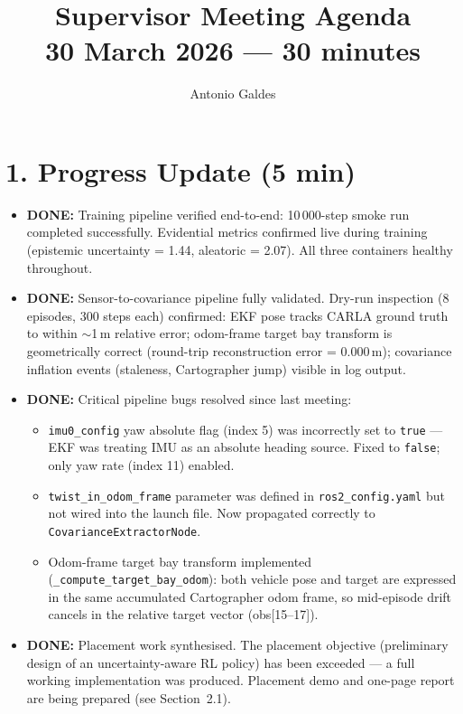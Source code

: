 \documentclass[11pt,a4paper]{article}
\title{Supervisor Meeting Agenda\\
\large 30 March 2026 --- 30 minutes}
\author{Antonio Galdes}
\date{}
\newcommand{\done}[1]{\textcolor{done}{\textbf{DONE:}} #1}
\begin{document}
\maketitle

\section*{1. Progress Update (5 min)}

\begin{itemize}[leftmargin=*]
  \item \done{Training pipeline verified end-to-end: 10\,000-step smoke run completed
    successfully. Evidential metrics confirmed live during training
    (epistemic uncertainty = 1.44, aleatoric = 2.07). All three containers
    healthy throughout.}

  \item \done{Sensor-to-covariance pipeline fully validated. Dry-run inspection
    (8 episodes, 300 steps each) confirmed: EKF pose tracks CARLA ground truth
    to within $\sim$1\,m relative error; odom-frame target bay transform is
    geometrically correct (round-trip reconstruction error = 0.000\,m);
    covariance inflation events (staleness, Cartographer jump) visible in log
    output.}

  \item \done{Critical pipeline bugs resolved since last meeting:
    \begin{itemize}
      \item \texttt{imu0\_config} yaw absolute flag (index 5) was incorrectly
        set to \texttt{true} --- EKF was treating IMU as an absolute heading
        source. Fixed to \texttt{false}; only yaw rate (index 11) enabled.
      \item \texttt{twist\_in\_odom\_frame} parameter was defined in
        \texttt{ros2\_config.yaml} but not wired into the launch file.
        Now propagated correctly to \texttt{CovarianceExtractorNode}.
      \item Odom-frame target bay transform implemented
        (\texttt{\_compute\_target\_bay\_odom}): both vehicle pose and target
        are expressed in the same accumulated Cartographer odom frame, so
        mid-episode drift cancels in the relative target vector
        (obs[15--17]).
    \end{itemize}}

  \item \done{Placement work synthesised. The placement objective (preliminary
    design of an uncertainty-aware RL policy) has been exceeded --- a full
    working implementation was produced. Placement demo and one-page report
    are being prepared (see Section~2.1).}


\end{itemize}
\end{document}
